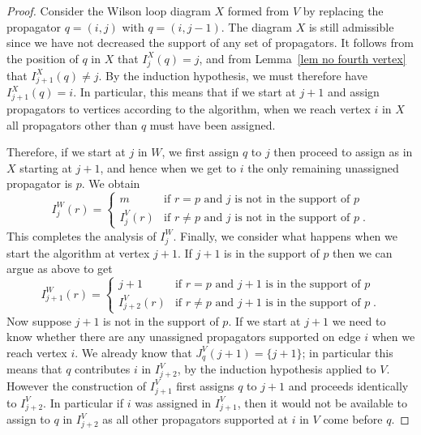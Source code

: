 \documentclass[11pt]{article}
\theoremstyle{remark}
\theoremstyle{definition}
\begin{document}
\begin{proof}
Consider the Wilson loop diagram $X$ formed from $V$ by replacing the propagator $q = (i,j)$ with $q = (i, j-1)$. The diagram  $X$ is still admissible since we have not decreased the support of any set of propagators. 
It follows from the position of $q$ in $X$ that $I_j^X(q) = j$, and from Lemma~\ref{lem no fourth vertex} that $I_{j+1}^X(q) \neq j$. By the induction hypothesis, we must therefore have $I_{j+1}^X(q) = i$.  In particular, this means that if we start at $j+1$ and assign propagators to vertices according to the algorithm, when we reach vertex $i$ in $X$ all propagators other than $q$ must have been assigned.

Therefore, if we start at $j$ in $W$, we first assign $q$ to $j$ then proceed to assign as in $X$ starting at $j+1$, and hence when we get to $i$ the only remaining unassigned propagator is $p$. We obtain
       \[
       I_j^{W}(r) = \begin{cases}

       m & \text{if $r =p$ and $j$ is not in the support of $p$} \\
       I_{j}^{V}(r) & \text{if $r\neq p$ and $j$ is not in the support of $p$}\; .\end{cases} 
       \]  
This completes the analysis of $I_j^W$. Finally, we consider what happens when we start the algorithm at vertex $j+1$. If $j+1$ is in the support of $p$ then we can argue as above to get
\[
       I_{j+1}^{W}(r)  = \begin{cases}
         j+1 & \text{if $r=p$ and $j+1$ is in the support of $p$}\\
         I_{j+2}^{V}(r) & \text{if $r\neq p$ and $j+1$ is in the support of $p$}\;.
       \end{cases}
       \]
Now suppose $j+1$ is not in the support of $p$. If we start at $j+1$ we need to know whether there are any unassigned propagators supported on edge $i$ when we reach vertex $i$. We already know that $J_q^{V}(j+1) = \{j+1\}$; in particular this means that $q$ contributes $i$ in $I_{j+2}^{V}$, by the induction hypothesis applied to $V$. However the construction of $I^{V}_{j+1}$ first assigns $q$ to $j+1$ and proceeds identically to $I^{V}_{j+2}$.  In particular if $i$ was assigned in $I^{V}_{j+1}$, then it would not be available to assign to $q$ in $I^{V}_{j+2}$ as all other propagators supported at $i$ in $V$ come before $q$. 


\end{proof}
\end{document}
